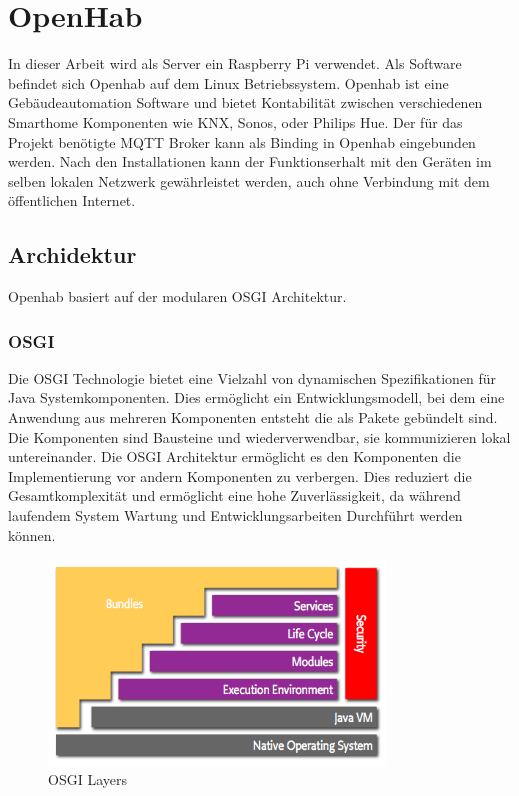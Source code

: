 \section{OpenHab}
In dieser Arbeit wird als Server ein Raspberry Pi verwendet. Als Software befindet sich Openhab auf dem Linux Betriebssystem. Openhab ist eine Gebäudeautomation Software und bietet Kontabilität zwischen verschiedenen Smarthome Komponenten wie KNX, Sonos, oder Philips Hue. Der für das Projekt benötigte MQTT Broker kann als Binding in Openhab eingebunden werden. Nach den Installationen kann der Funktionserhalt mit den Geräten im selben lokalen Netzwerk gewährleistet werden, auch ohne Verbindung mit dem öffentlichen Internet.
\subsection{Archidektur}
Openhab basiert auf der modularen OSGI Architektur.
\subsubsection{OSGI}
Die OSGI Technologie bietet eine Vielzahl  von dynamischen Spezifikationen für Java Systemkomponenten. Dies ermöglicht ein Entwicklungsmodell, bei dem eine Anwendung aus  mehreren Komponenten entsteht die als Pakete gebündelt sind. Die Komponenten sind Bausteine und wiederverwendbar, sie kommunizieren lokal untereinander. Die OSGI Architektur ermöglicht es den Komponenten die Implementierung vor andern Komponenten zu verbergen. Dies reduziert die Gesamtkomplexität und ermöglicht eine hohe Zuverlässigkeit, da während laufendem System Wartung und Entwicklungsarbeiten Durchführt werden können.  


 \begin{figure}[H]
	\centering
	\includegraphics[width=0.8\textwidth]{graphics/OSGI.png}
	\caption{OSGI Layers \cite{noauthor_osgi_nodate} }	
	\label{pic: OSGILayers}
\end{figure} 

